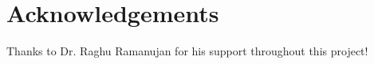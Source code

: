 
\section{Acknowledgements} 
\label{sec:ack} 

Thanks to Dr. Raghu Ramanujan for his support throughout this project!